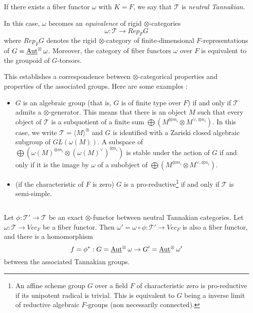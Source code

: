 \documentclass[../main.tex]{subfiles}
\begin{document}
\subsection{} If there exists a fiber functor $\omega$ with $K = F$, we say that $\mathcal{T}$ is \emph{neutral Tannakian}.

In this case, $\omega$ becomes an \emph{equivalence} of rigid $\otimes$-categories
$$\omega : \mathcal{T} \to Rep_F G$$
where $Rep_F G$ denotes the rigid $\otimes$-category of finite-dimensional $F$-representations of $G = \operatorname{\underline{Aut}}^{\otimes} \omega$.
Moreover, the category of fiber functors $\omega$ over $F$ is equivalent to the groupoid of $G$-torsors.

This establishes a correspondence between $\otimes$-categorical properties and properties of the associated groups.
Here are some examples :
\begin{itemize}
    \item $G$ is an algebraic group (that is, $G$ is of finite type over $F$) if and only if $\mathcal{T}$ admits a $\otimes$-generator.
    This means that there is an object $M$ such that every object of $\mathcal{T}$ is a subquotient of a finite sum $\bigoplus (M^{\otimes m_i} \otimes M^{\vee, \otimes n_i})$.
    In this case, we write $\mathcal{T} = \langle M \rangle^{\otimes}$ and $G$ is identified with a Zariski closed algebraic subgroup of $GL(\omega(M))$.
    A subspace of $\bigoplus (\omega(M)^{\otimes m_i} \otimes (\omega(M)^{\vee})^{\otimes n_i})$ is stable under the action of $G$ if and only if it is the image by $\omega$ of a subobject of $\bigoplus (M^{\otimes m_i} \otimes M^{\vee, \otimes n_i})$.
    \item (if the characteristic of $F$ is zero) $G$ is a pro-reductive\footnote{An affine scheme group $G$ over a field $F$ of characteristic zero is pro-reductive if its unipotent radical is trivial. This is equivalent to $G$ being a inverse limit of reductive algebraic $F$-groups (non necessarily connected).} if and only if $\mathcal{T}$ is semi-simple.
\end{itemize}

\subsection{} Let $\phi : \mathcal{T}' \to \mathcal{T}$ be an exact $\otimes$-functor between neutral Tannakian categories.
Let $\omega : \mathcal{T} \to Vec_F$ be a fiber functor.
Then $\omega' = \omega \circ \phi : \mathcal{T}' \to Vec_F$ is also a fiber functor, and there is a homomorphism
$$f = \phi^* : G = \operatorname{\underline{Aut}}^{\otimes} \omega \to G' = \operatorname{\underline{Aut}}^{\otimes} \omega'$$
between the associated Tannakian groups.
\end{document}
